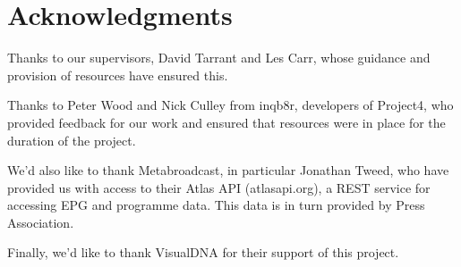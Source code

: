 \section{Acknowledgments}

Thanks to our supervisors, David Tarrant and Les Carr, whose guidance and provision of resources have ensured this.

Thanks to Peter Wood and Nick Culley from inqb8r, developers of Project4, who provided feedback for our work and ensured that resources were in place for the duration of the project.

We'd also like to thank Metabroadcast, in particular Jonathan Tweed, who have provided us with access to their Atlas API (atlasapi.org), a REST service for accessing EPG and programme data. This data is in turn provided by Press Association.

Finally, we'd like to thank VisualDNA for their support of this project.

\cleardoublepage
\setcounter{tocdepth}{2}

\begin{comment}
	\tableofcontents
	\newpage
	\cleardoublepage
	\setcounter{page}{0}
	\pagenumbering{arabic}
	\cleardoublepage
\end{comment}

